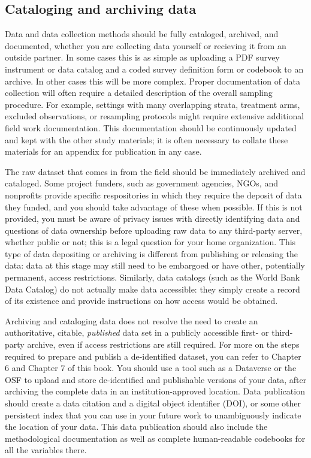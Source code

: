 \subsection{Cataloging and archiving data}

Data and data collection methods should be fully cataloged, archived, and documented,
whether you are collecting data yourself or recieving it from an outside partner.
In some cases this is as simple as uploading a PDF survey instrument or data catalog
and a coded survey definition form or codebook to an archive.
In other cases this will be more complex.
Proper documentation of data collection will often require
a detailed description of the overall sampling procedure.
For example, settings with many overlapping strata,
treatment arms, excluded observations, or resampling protocols
might require extensive additional field work documentation.
This documentation should be continuously updated
and kept with the other study materials;
it is often necessary to collate these materials
for an appendix for publication in any case.

The raw dataset that comes in from the field should be immediately archived and cataloged.
Some project funders, such as government agencies, NGOs, and nonprofits
provide specific respositories in which they require the deposit of data they funded,
and you should take advantage of these when possible.
If this is not provided, you must be aware of privacy issues
with directly identifying data and questions of data ownership
before uploading raw data to any third-party server, whether public or not;
this is a legal question for your home organization.
This type of data depositing or archiving
is different from publishing or releasing the data:
data at this stage may still need to be embargoed
or have other, potentially permanent, access restrictions.
Similarly, data catalogs (such as the World Bank Data Catalog)
do not actually make data accessible: they simply create a record of its existence
and provide instructions on how access would be obtained.

Archiving and cataloging data does not resolve
the need to create an authoritative, citable, \textit{published} data set
in a publicly accessible first- or third-party archive,
even if access restrictions are still required.
For more on the steps required to prepare and publish a de-identified dataset,
you can refer to Chapter 6 and Chapter 7 of this book.
You should use a tool such as a Dataverse or the OSF
to upload and store de-identified and publishable versions of your data,
after archiving the complete data in an institution-approved location.
Data publication should create a data citation and a digital object identifier (DOI),
or some other persistent index that you can use in your future work
to unambiguously indicate the location of your data.
This data publication should also include the methodological documentation
as well as complete human-readable codebooks for all the variables there.

